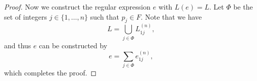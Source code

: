 \begin{proof}
  Now we construct the regular expression $e$ with $L(e) = L$.
  Let $\Phi$ be the set of integers $j \in \{1, \dots, n\}$ such that
  $p_j \in F$.
  Note that we have
  \begin{equation*}
    L = \bigcup_{j \in \Phi} L_{1j}^{(n)},
  \end{equation*}
  and thus $e$ can be constructed by
  \begin{equation*}
    e = \sum_{j \in \Phi} e_{1j}^{(n)},
  \end{equation*}
  which completes the proof.
\end{proof}